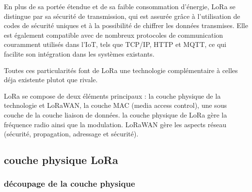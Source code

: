 \documentclass[12pt,a4paper,oneside, titlepage]{report}
\begin{document}
En plus de sa portée étendue et de sa faible consommation d'énergie, LoRa se distingue par sa sécurité de transmission, qui est assurée grâce à l'utilisation de codes de sécurité uniques et à la possibilité de chiffrer les données transmises. Elle est également compatible avec de nombreux protocoles de communication couramment utilisés dans l'IoT, tels que TCP/IP, HTTP et MQTT, ce qui facilite son intégration dans les systèmes existants.

Toutes ces  particularités font de LoRa une technologie complémentaire à celles déja existente plutot que rivale.

LoRa se compose de deux éléments principaux : la couche physique de la technologie et LoRaWAN, la couche MAC (media access control), une sous couche de la couche liaison de données. la couche physique de LoRa gère la fréquence radio ainsi que la modulation. LoRaWAN gère les aspects réseau (sécurité, propagation, adressage et sécurité).

\subsection{couche physique LoRa}

\subsubsection{découpage de la couche physique}
\end{document}

